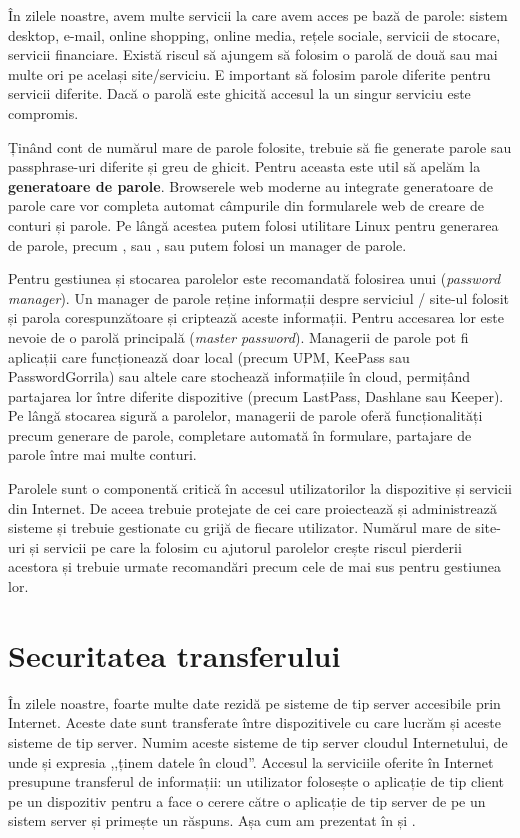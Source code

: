 În zilele noastre, avem multe servicii la care avem acces pe bază de parole: sistem desktop, e-mail, online shopping, online media, rețele sociale, servicii de stocare, servicii financiare. Există riscul să ajungem să folosim o parolă de două sau mai multe ori pe același site/serviciu. E important să folosim parole diferite pentru servicii diferite. Dacă o parolă este ghicită accesul la un singur serviciu este compromis.

Ținând cont de numărul mare de parole folosite, trebuie să fie generate parole sau passphrase-uri diferite și greu de ghicit. Pentru aceasta este util să apelăm la \textbf{generatoare de parole}. Browserele web moderne au integrate generatoare de parole care vor completa automat câmpurile din formularele web de creare de conturi și parole. Pe lângă acestea putem folosi utilitare Linux pentru generarea de parole, precum ,  sau , sau putem folosi un manager de parole.

Pentru gestiunea și stocarea parolelor este recomandată folosirea unui  (\textit{password manager}). Un manager de parole reține informații despre serviciul / site-ul folosit și parola corespunzătoare și criptează aceste informații. Pentru accesarea lor este nevoie de o parolă principală (\textit{master password}). Managerii de parole pot fi aplicații care funcționează doar local (precum UPM, KeePass sau PasswordGorrila) sau altele care stochează informațiile în cloud, permițând partajarea lor între diferite dispozitive (precum LastPass, Dashlane sau Keeper). Pe lângă stocarea sigură a parolelor, managerii de parole oferă funcționalități precum generare de parole, completare automată în formulare, partajare de parole între mai multe conturi.

Parolele sunt o componentă critică în accesul utilizatorilor la dispozitive și servicii din Internet. De aceea trebuie protejate de cei care proiectează și administrează sisteme și trebuie gestionate cu grijă de fiecare utilizator. Numărul mare de site-uri și servicii pe care la folosim cu ajutorul parolelor crește riscul pierderii acestora și trebuie urmate recomandări precum cele de mai sus pentru gestiunea lor.

\section{Securitatea transferului}
\label{sec:sec:transfer}

În zilele noastre, foarte multe date rezidă pe sisteme de tip server accesibile prin Internet. Aceste date sunt transferate între dispozitivele cu care lucrăm și aceste sisteme de tip server. Numim aceste sisteme de tip server cloudul Internetului, de unde și expresia ,,ținem datele în cloud''. Accesul la serviciile oferite în Internet presupune transferul de informații: un utilizator folosește o aplicație de tip client pe un dispozitiv pentru a face o cerere către o aplicație de tip server de pe un sistem server și primește un răspuns. Așa cum am prezentat în  și .

